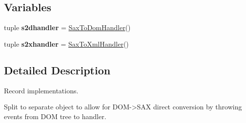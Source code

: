 \subsection*{Variables}
\begin{DoxyCompactItemize}
\item 
\hypertarget{namespacecheshire3_1_1record_ad21648a091bd1b12507bfcd9d38fb2fe}{tuple {\bfseries s2dhandler} = \hyperlink{classcheshire3_1_1record_1_1_sax_to_dom_handler}{Sax\-To\-Dom\-Handler}()}\label{namespacecheshire3_1_1record_ad21648a091bd1b12507bfcd9d38fb2fe}

\item 
\hypertarget{namespacecheshire3_1_1record_a974ef3ed29f3fd817daccbb1e546cc93}{tuple {\bfseries s2xhandler} = \hyperlink{classcheshire3_1_1record_1_1_sax_to_xml_handler}{Sax\-To\-Xml\-Handler}()}\label{namespacecheshire3_1_1record_a974ef3ed29f3fd817daccbb1e546cc93}

\end{DoxyCompactItemize}


\subsection{Detailed Description}
\begin{DoxyVerb}Record implementations.

Split to separate object to allow for DOM->SAX direct conversion by throwing
events from DOM tree to handler.
\end{DoxyVerb}
 